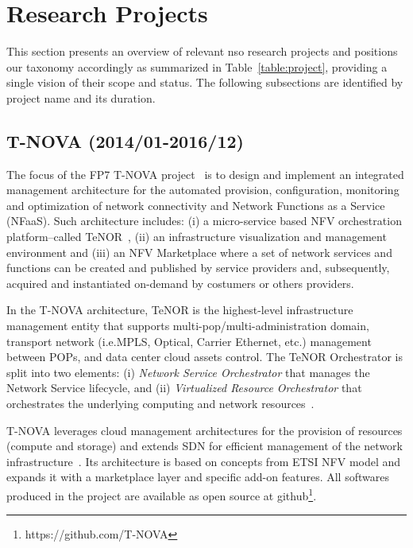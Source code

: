 \section{Research Projects}
\label{sec:project}

This section presents an overview of relevant \gls{nso} research projects and positions our taxonomy accordingly as summarized in Table~\ref{table:project}, providing a single vision of their scope and status. 
The following subsections are identified by project name and its duration.

\subsection{T-NOVA (2014/01-2016/12)}

The focus of the FP7 T-NOVA project~\cite{FP7projectT-NOVAT-NOVAInfrastructures} is to design and implement an integrated management architecture for the automated provision, configuration, monitoring and optimization of network connectivity and Network Functions as a Service (NFaaS). Such architecture includes: (i) a micro-service based NFV orchestration platform--called TeNOR~\cite{7502419}, (ii) an infrastructure visualization and management environment and (iii) an NFV Marketplace where a set of network services and functions can be created and published by service providers and, subsequently, acquired and instantiated on-demand by costumers or others providers.

In the T-NOVA architecture, TeNOR is the highest-level infrastructure management entity that supports multi-pop/multi-administration domain, transport network (i.e.MPLS, Optical, Carrier    Ethernet, etc.) management between POPs, and data center cloud assets control. The TeNOR Orchestrator is split into two elements: (i) \textit{Network Service Orchestrator} that manages the Network Service lifecycle, and (ii) \textit{Virtualized Resource Orchestrator} that orchestrates the underlying computing and network resources~\cite{Kourtis2017T-NOVA:Infrastructures}. 

T-NOVA leverages cloud management architectures for the provision of resources (compute and storage) and extends SDN for efficient management of the network infrastructure~\cite{T-NOVAD2.1:Requirements}. Its architecture is based on concepts from ETSI NFV model and expands it with a marketplace layer and specific add-on features. All softwares produced in the project are available as open source at github\footnote{https://github.com/T-NOVA}.

